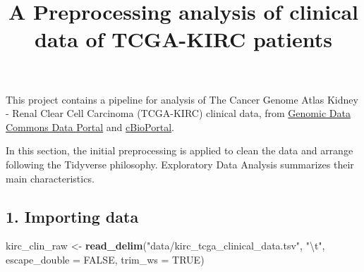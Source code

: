 \documentclass[]{article}
\title{A Preprocessing analysis of clinical data of TCGA-KIRC patients}
\author{}
\date{\vspace{-2.5em}}
\newenvironment{Shaded}{\begin{snugshade}}{\end{snugshade}}
\newcommand{\KeywordTok}[1]{\textcolor[rgb]{0.13,0.29,0.53}{\textbf{#1}}}
\newcommand{\DataTypeTok}[1]{\textcolor[rgb]{0.13,0.29,0.53}{#1}}
\newcommand{\DecValTok}[1]{\textcolor[rgb]{0.00,0.00,0.81}{#1}}
\newcommand{\CharTok}[1]{\textcolor[rgb]{0.31,0.60,0.02}{#1}}
\newcommand{\StringTok}[1]{\textcolor[rgb]{0.31,0.60,0.02}{#1}}
\newcommand{\CommentTok}[1]{\textcolor[rgb]{0.56,0.35,0.01}{\textit{#1}}}
\newcommand{\OtherTok}[1]{\textcolor[rgb]{0.56,0.35,0.01}{#1}}
\newcommand{\OperatorTok}[1]{\textcolor[rgb]{0.81,0.36,0.00}{\textbf{#1}}}
\newcommand{\NormalTok}[1]{#1}
\begin{document}
\maketitle

This project contains a pipeline for analysis of The Cancer Genome Atlas
Kidney - Renal Clear Cell Carcinoma (TCGA-KIRC) clinical data, from
\href{https://portal.gdc.cancer.gov/exploration?filters=\%7B\%22op\%22\%3A\%22and\%22\%2C\%22content\%22\%3A\%5B\%7B\%22op\%22\%3A\%22in\%22\%2C\%22content\%22\%3A\%7B\%22field\%22\%3A\%22cases.project.project_id\%22\%2C\%22value\%22\%3A\%5B\%22TCGA-KIRC\%22\%5D\%7D\%7D\%5D\%7D}{Genomic
Data Commons Data Portal} and
\href{https://www.cbioportal.org/study/summary?id=kirp_tcga}{cBioPortal}.

In this section, the initial preprocessing is applied to clean the data
and arrange following the Tidyverse philosophy. Exploratory Data
Analysis summarizes their main characteristics.

\begin{Shaded}
\end{Shaded}

\subsection{1. Importing data}\label{importing-data}

\begin{Shaded}
\begin{Highlighting}[]
\NormalTok{kirc_clin_raw <-}\StringTok{ }\KeywordTok{read_delim}\NormalTok{(}\StringTok{"data/kirc_tcga_clinical_data.tsv"}\NormalTok{, }\StringTok{"}\CharTok{\textbackslash{}t}\StringTok{"}\NormalTok{, }
                            \DataTypeTok{escape_double =} \OtherTok{FALSE}\NormalTok{, }
                            \DataTypeTok{trim_ws =} \OtherTok{TRUE}\NormalTok{)}
\end{Highlighting}
\end{Shaded}
\end{document}

